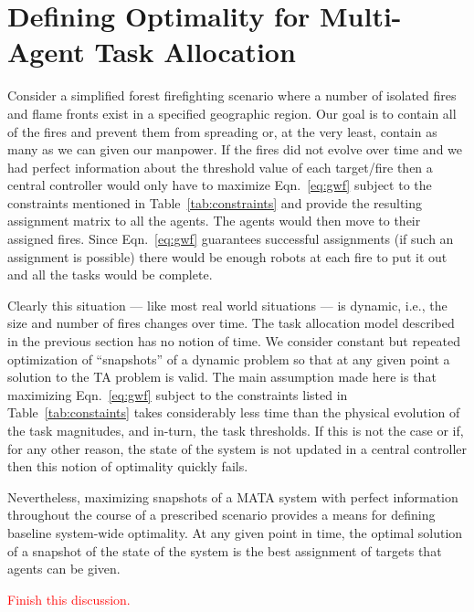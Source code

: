 \documentclass[defaultstyle,12pt]{thesis}
\begin{document}
\section{Defining Optimality for Multi-Agent Task Allocation}\label{sec:optimaldef}
Consider a simplified forest firefighting scenario where a number of isolated fires and flame fronts exist in a specified geographic region. Our goal is to contain all of the fires and prevent them from spreading or, at the very least, contain as many as we can given our manpower. If the fires did not evolve over time and we had perfect information about the threshold value of each target/fire then a central controller would only have to maximize Eqn.~\eqref{eq:gwf} subject to the constraints mentioned in Table~\ref{tab:constraints} and provide the resulting assignment matrix to all the agents. The agents would then move to their assigned fires. Since Eqn.~\eqref{eq:gwf} guarantees successful assignments (if such an assignment is possible) there would be enough robots at each fire to put it out and all the tasks would be complete. 

Clearly this situation --- like most real world situations --- is dynamic, i.e., the size and number of fires changes over time. The task allocation model described in the previous section has no notion of time. We consider constant but repeated optimization of ``snapshots'' of a dynamic problem so that at any given point a solution to the TA problem is valid. The main assumption made here is that maximizing Eqn.~\eqref{eq:gwf} subject to the constraints listed in Table~\ref{tab:constaints} takes considerably less time than the physical evolution of the task magnitudes, and in-turn, the task thresholds. If this is not the case or if, for any other reason, the state of the system is not updated in a central controller then this notion of optimality quickly fails.

Nevertheless, maximizing snapshots of a MATA system with perfect information throughout the course of a prescribed scenario provides a means for defining baseline system-wide optimality. At any given point in time, the optimal solution of a snapshot of the state of the system is the best assignment of targets that agents can be given.

\textcolor{red}{Finish this discussion.} 

\end{document}
